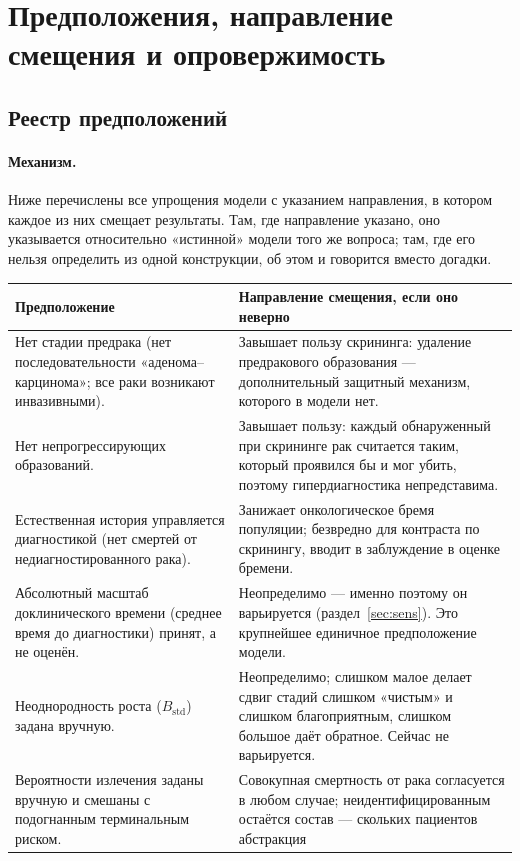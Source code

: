 \documentclass[12pt,a4paper]{article}
\newcommand{\mech}[1]{\paragraph{Механизм.} #1}
\begin{document}
\section{Предположения, направление смещения и опровержимость}
\label{sec:assumptions}

\subsection{Реестр предположений}

\mech{Ниже перечислены все упрощения модели с указанием направления, в котором каждое из них смещает
результаты. Там, где направление указано, оно указывается относительно «истинной» модели того же вопроса;
там, где его нельзя определить из одной конструкции, об этом и говорится вместо догадки.

\begin{center}
\footnotesize
\begin{tabular}{@{}p{8.0cm}p{7.6cm}@{}}
\toprule
\textbf{Предположение} & \textbf{Направление смещения, если оно неверно} \\
\midrule
Нет стадии предрака (нет последовательности «аденома--карцинома»; все раки возникают инвазивными). &
Завышает пользу скрининга: удаление предракового образования --- дополнительный защитный механизм, которого в
модели нет. \\
Нет непрогрессирующих образований. & Завышает пользу: каждый обнаруженный при скрининге рак считается таким,
который проявился бы и мог убить, поэтому гипердиагностика непредставима. \\
Естественная история управляется диагностикой (нет смертей от недиагностированного рака). & Занижает
онкологическое бремя популяции; безвредно для контраста по скринингу, вводит в заблуждение в оценке бремени. \\
Абсолютный масштаб доклинического времени (среднее время до диагностики) принят, а не оценён. & Неопределимо
--- именно поэтому он варьируется (раздел~\ref{sec:sens}). Это крупнейшее единичное предположение модели. \\
Неоднородность роста ($B_{\text{std}}$) задана вручную. & Неопределимо; слишком малое делает сдвиг стадий
слишком «чистым» и слишком благоприятным, слишком большое даёт обратное. Сейчас не варьируется. \\
Вероятности излечения заданы вручную и смешаны с подогнанным терминальным риском. & Совокупная смертность
от рака согласуется в любом случае; неидентифицированным остаётся состав --- скольких пациентов абстракция

\end{tabular}
\end{center}}
\end{document}
